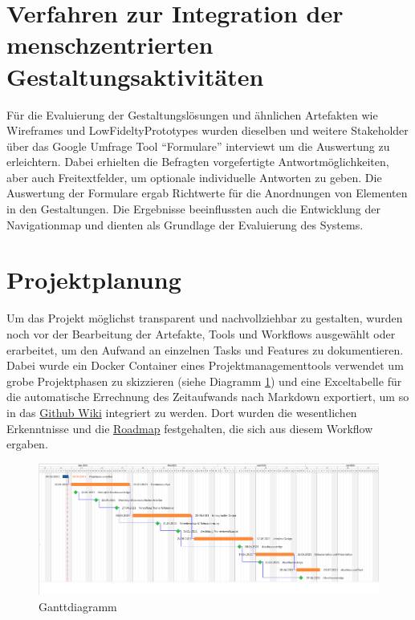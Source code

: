 \section{Verfahren zur Integration der menschzentrierten Gestaltungsaktivitäten}     
Für die Evaluierung der Gestaltungslösungen und ähnlichen Artefakten wie Wireframes und LowFideltyPrototypes wurden dieselben und weitere Stakeholder über das Google Umfrage Tool {``Formulare''} interviewt um die Auswertung zu erleichtern. Dabei erhielten die Befragten vorgefertigte Antwortmöglichkeiten, aber auch Freitextfelder, um optionale individuelle Antworten zu geben. Die Auswertung der Formulare ergab Richtwerte für die Anordnungen von Elementen in den Gestaltungen. Die Ergebnisse beeinflussten auch die Entwicklung der Navigationmap und dienten als Grundlage der Evaluierung des Systems.

\section{Projektplanung}
Um das Projekt möglichst transparent und nachvollziehbar zu gestalten, wurden noch vor der Bearbeitung der Artefakte, Tools und Workflows ausgewählt oder erarbeitet, um den Aufwand an einzelnen Tasks und Features zu dokumentieren. Dabei wurde ein Docker Container eines Projektmanagementtools verwendet um grobe Projektphasen zu skizzieren (siehe Diagramm \ref{fig:ganttdiagramm}) und eine Exceltabelle für die automatische Errechnung des Zeitaufwands nach Markdown exportiert, um so in das \href{https://github.com/Inf166/design-concept-sharing-recipies/wiki}{Github Wiki} integriert zu werden. Dort wurden die wesentlichen Erkenntnisse und die \href{https://github.com/Inf166/design-concept-sharing-recipies/wiki/Roadmap}{Roadmap} festgehalten, die sich aus diesem Workflow ergaben.\\

\begin{figure}[h] %
    \includegraphics[width=1\textwidth]{images/ganttdiagramm.png}
    \caption[Ganttdiagramm]{Ganttdiagramm}
    \label{fig:ganttdiagramm}
\end{figure}

